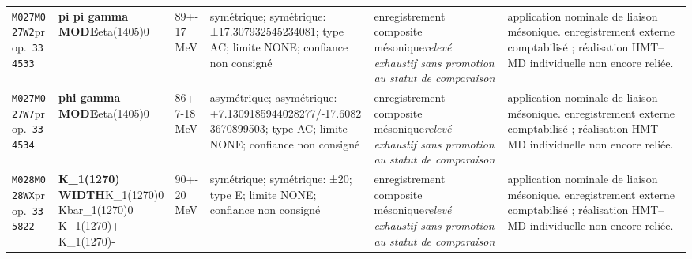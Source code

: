 \begin{landscape}
\begin{longtable}{L{1.85cm}L{4.45cm}L{2.35cm}L{4.05cm}L{3.35cm}L{7.15cm}}
\texttt{M027}\newline \texttt{M027W2}\newline prop.\ \texttt{334533} & \textbf{pi pi gamma MODE}\newline eta(1405)0 & 89+-17\,MeV & symétrique; symétrique: ±17.307932545234081; type AC; limite NONE; confiance non consigné & enregistrement composite mésonique\newline \emph{relevé exhaustif sans promotion au statut de comparaison} & application nominale de liaison mésonique. enregistrement externe comptabilisé ; réalisation HMT--MD individuelle non encore reliée. \\
\texttt{M027}\newline \texttt{M027W7}\newline prop.\ \texttt{334534} & \textbf{phi gamma MODE}\newline eta(1405)0 & 86+7-18\,MeV & asymétrique; asymétrique: +7.1309185944028277/-17.60823670899503; type AC; limite NONE; confiance non consigné & enregistrement composite mésonique\newline \emph{relevé exhaustif sans promotion au statut de comparaison} & application nominale de liaison mésonique. enregistrement externe comptabilisé ; réalisation HMT--MD individuelle non encore reliée. \\
\texttt{M028}\newline \texttt{M028WX}\newline prop.\ \texttt{335822} & \textbf{K\_\allowbreak{}1(1270) WIDTH}\newline K\_\allowbreak{}1(1270)0 \textbar{}\allowbreak{} Kbar\_\allowbreak{}1(1270)0 \textbar{}\allowbreak{} K\_\allowbreak{}1(1270)+ \textbar{}\allowbreak{} K\_\allowbreak{}1(1270)- & 90+-20\,MeV & symétrique; symétrique: ±20; type E; limite NONE; confiance non consigné & enregistrement composite mésonique\newline \emph{relevé exhaustif sans promotion au statut de comparaison} & application nominale de liaison mésonique. enregistrement externe comptabilisé ; réalisation HMT--MD individuelle non encore reliée. \\

\end{longtable}
\end{landscape}
